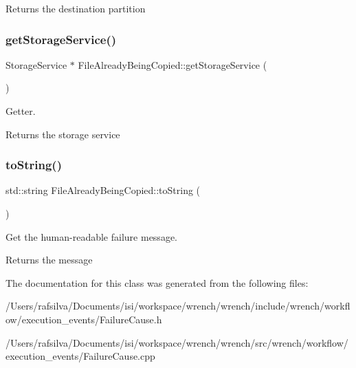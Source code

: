 \begin{DoxyReturn}{Returns}
the destination partition 
\end{DoxyReturn}
\mbox{\label{class_file_already_being_copied_aadf9994fec4902b1abdd42c3e37c29bd}} 
\subsubsection{\texorpdfstring{get\+Storage\+Service()}{getStorageService()}}
{\footnotesize\ttfamily Storage\+Service $\ast$ File\+Already\+Being\+Copied\+::get\+Storage\+Service (\begin{DoxyParamCaption}{ }\end{DoxyParamCaption})}



Getter. 

\begin{DoxyReturn}{Returns}
the storage service 
\end{DoxyReturn}
\mbox{\label{class_file_already_being_copied_a2d1a19d14abd21b3e47d36264cf367a8}} 
\subsubsection{\texorpdfstring{to\+String()}{toString()}}
{\footnotesize\ttfamily std\+::string File\+Already\+Being\+Copied\+::to\+String (\begin{DoxyParamCaption}{ }\end{DoxyParamCaption})}



Get the human-\/readable failure message. 

\begin{DoxyReturn}{Returns}
the message 
\end{DoxyReturn}


The documentation for this class was generated from the following files\+:\begin{DoxyCompactItemize}
\item 
/\+Users/rafsilva/\+Documents/isi/workspace/wrench/wrench/include/wrench/workflow/execution\+\_\+events/Failure\+Cause.\+h\item 
/\+Users/rafsilva/\+Documents/isi/workspace/wrench/wrench/src/wrench/workflow/execution\+\_\+events/Failure\+Cause.\+cpp\end{DoxyCompactItemize}
